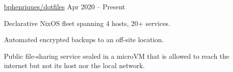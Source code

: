 \begin{cventries}
  \openSourceEntry
    {\href{https://github.com/bphenriques/dotfiles}{bphenriques/dotfiles}}
    {Apr 2020 – Present}
    {
    \begin{openSourceItems}
        \item Declarative NixOS fleet spanning 4 hosts, 20+ services.
        \item Automated encrypted backups to an off-site location.
        \item Public file-sharing service sealed in a microVM that is allowed to reach the internet but not its host nor the local network.
    \end{openSourceItems}
    \vspace{4mm}
    }
  \fi

%


%

    
\end{cventries}
